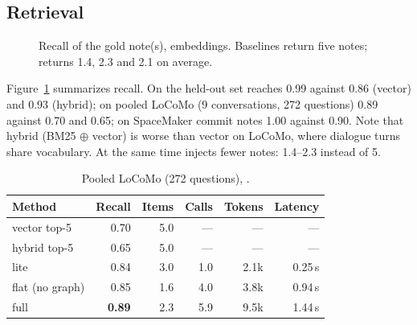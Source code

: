 \subsection{Retrieval}

\begin{figure}[t]
\centering
{}
\caption{Recall of the gold note(s),  embeddings. Baselines return five notes; \jevmem{} returns 1.4, 2.3 and 2.1 on average.}
\label{fig:recall-bars}
\end{figure}

Figure~\ref{fig:recall-bars} summarizes recall. On the held-out set \jevmem{} reaches 0.99 against 0.86 (vector) and 0.93 (hybrid); on pooled LoCoMo (9 conversations, 272 questions) 0.89 against 0.70 and 0.65; on SpaceMaker commit notes 1.00 against 0.90. Note that hybrid (BM25 $\oplus$ vector) is worse than vector on LoCoMo, where dialogue turns share vocabulary. At the same time \jevmem{} injects fewer notes: 1.4--2.3 instead of 5.

\begin{table}[h]
\caption{Pooled LoCoMo (272 questions), .}
\label{tab:locomo}
\small
\begin{tabular}{@{}lrrrrr@{}}
\toprule
Method & Recall & Items & Calls & Tokens & Latency \\
\midrule
vector top-5 & 0.70 & 5.0 & --- & --- & --- \\
hybrid top-5 & 0.65 & 5.0 & --- & --- & --- \\
lite & 0.84 & 3.0 & 1.0 & 2.1k & 0.25\,s \\
flat (no graph) & 0.85 & 1.6 & 4.0 & 3.8k & 0.94\,s \\
full & \textbf{0.89} & 2.3 & 5.9 & 9.5k & 1.44\,s \\
\bottomrule
\end{tabular}
\end{table}


